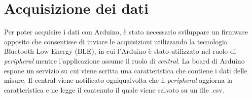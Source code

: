 \section{Acquisizione dei dati}
Per poter acquisire i dati con Arduino, è stato necessario sviluppare un firmware apposito che consentisse di inviare le acquisizioni utilizzando la tecnologia Bluetooth Low Energy (BLE), in cui l'Arduino è stato utilizzato nel ruolo di \textit{peripheral} mentre l'applicazione assume il ruolo di \textit{central}. La board di Arduino espone un servizio su cui viene scritta una caratteristica che contiene i dati delle misure. Il central viene notificato ogniqualvolta che il \textit{peripheral} aggiorna la caratteristica e ne legge il contenuto il quale viene salvato su un file .csv.

